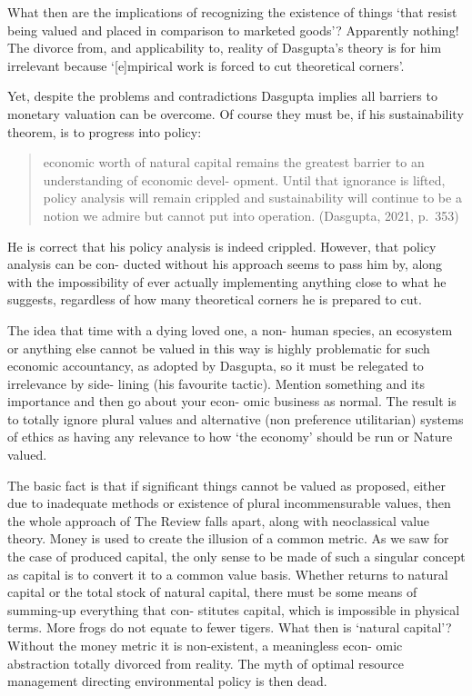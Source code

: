 \documentclass[
]{book}
\begin{document}
What then are the implications of recognizing the existence of things `that resist being valued and placed
in comparison to marketed goods'? Apparently nothing! The divorce from, and applicability to, reality
of Dasgupta's theory is for him irrelevant because `{[}e{]}mpirical work is forced to cut theoretical corners'.

Yet, despite the problems and contradictions Dasgupta implies all barriers to monetary valuation
can be overcome. Of course they must be, if his sustainability theorem, is to progress into policy:

\begin{quote}
economic worth of natural capital remains the greatest barrier to an understanding of economic devel-
opment. Until that ignorance is lifted, policy analysis will remain crippled and sustainability will continue to be a notion we admire but cannot put into operation. (Dasgupta, 2021, p.~353)
\end{quote}

He is correct that his policy analysis is indeed crippled. However, that policy analysis can be con-
ducted without his approach seems to pass him by, along with the impossibility of ever actually
implementing anything close to what he suggests, regardless of how many theoretical corners he
is prepared to cut.

The idea that time with a dying loved one, a non-
human species, an ecosystem or anything else cannot be valued in this way is highly problematic for
such economic accountancy, as adopted by Dasgupta, so it must be relegated to irrelevance by side-
lining (his favourite tactic). Mention something and its importance and then go about your econ-
omic business as normal. The result is to totally ignore plural values and alternative (non preference
utilitarian) systems of ethics as having any relevance to how `the economy' should be run or Nature
valued.

The basic fact is that if significant things cannot be valued as proposed, either due to inadequate
methods or existence of plural incommensurable values, then the whole approach of The Review
falls apart, along with neoclassical value theory. Money is used to create the illusion of a common
metric. As we saw for the case of produced capital, the only sense to be made of such a singular
concept as capital is to convert it to a common value basis. Whether returns to natural capital
or the total stock of natural capital, there must be some means of summing-up everything that con-
stitutes capital, which is impossible in physical terms. More frogs do not equate to fewer tigers.
What then is `natural capital'? Without the money metric it is non-existent, a meaningless econ-
omic abstraction totally divorced from reality. The myth of optimal resource management directing
environmental policy is then dead.
\end{document}

